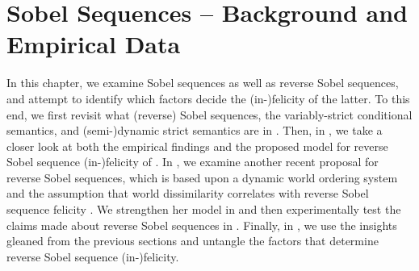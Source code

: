 \chapter{Sobel Sequences -- Background and Empirical Data}
In this chapter, we examine Sobel sequences as well as reverse Sobel sequences, and attempt to identify which factors decide the (in-)felicity of the latter. To this end, we first revisit what (reverse) Sobel sequences, the variably-strict conditional semantics, and (semi-)dynamic strict semantics are in . Then, in , we take a closer look at both the empirical findings and the proposed model for reverse Sobel sequence (in-)felicity of \textcite{Klecha2014,Klecha2015}. In , we examine another recent proposal for reverse Sobel sequences, which is based upon a dynamic world ordering system \parencite{Lewis2016} and the assumption that world dissimilarity correlates with reverse Sobel sequence felicity \parencite{Lewis2018}. We strengthen her model in  and then experimentally test the claims made about reverse Sobel sequences in . Finally, in , we use the insights gleaned from the previous sections and untangle the factors that determine reverse Sobel sequence (in-)felicity.

